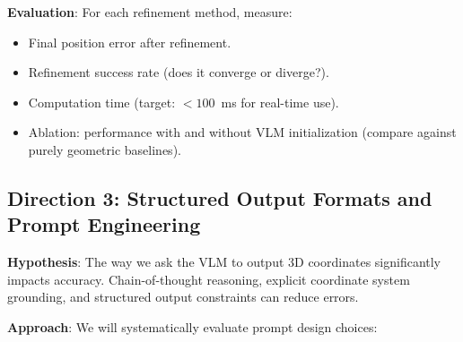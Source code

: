 \documentclass[11pt,a4paper]{article}
\begin{document}
\textbf{Evaluation}: For each refinement method, measure:
\begin{itemize}[nosep]
    \item Final position error after refinement.
    \item Refinement success rate (does it converge or diverge?).
    \item Computation time (target: $<100$~ms for real-time use).
    \item Ablation: performance with and without VLM initialization (compare against purely geometric baselines).
\end{itemize}

\subsection{Direction 3: Structured Output Formats and Prompt Engineering}

\textbf{Hypothesis}: The way we ask the VLM to output 3D coordinates significantly impacts accuracy. Chain-of-thought reasoning, explicit coordinate system grounding, and structured output constraints can reduce errors.

\textbf{Approach}: We will systematically evaluate prompt design choices:
\end{document}
